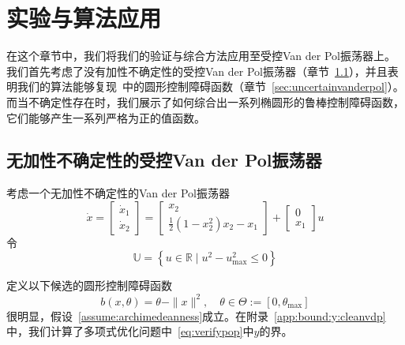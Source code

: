 
\chapter{实验与算法应用}

在这个章节中，我们将我们的验证与综合方法应用至受控Van der Pol振荡器上。我们首先考虑了没有加性不确定性的受控Van der Pol振荡器（章节~\ref{sec:cleanvanderpol}），并且表明我们的算法能够复现~\cite{clark22arxiv-cbf}中的圆形控制障碍函数（章节~\ref{sec:uncertainvanderpol}）。而当不确定性存在时，我们展示了如何综合出一系列椭圆形的鲁棒控制障碍函数，它们能够产生一系列严格为正的值函数。

\section{无加性不确定性的受控Van der Pol振荡器}
\label{sec:cleanvanderpol}

考虑一个无加性不确定性的Van der Pol振荡器~\cite{clark22arxiv-cbf}
\begin{equation}\label{eq:cleanvdpodynamics}
    \dot{x} = \left[ \begin{array}{c}
        \dot{x}_1 \\ \dot{x}_2
    \end{array} \right] 
    = \left[ \begin{array}{c}
        x_2 \\
        \frac{1}{2}(1 - x_2^2) x_2 - x_1
    \end{array} \right]
    + \left[ \begin{array}{c}
        0 \\ x_1
    \end{array} \right] u
\end{equation}
令
\begin{equation}\label{eq:cleanvdpou}
    \mathbb{U} = \left\{ u \in \mathbb{R} \mid u^2 - u_{\max}^2 \le 0 \right\}
\end{equation}

定义以下候选的圆形控制障碍函数
\begin{equation}
    \label{eq:cleanvdpocbf}
    b(x, \theta) = \theta - \parallel x \parallel^2, \quad \theta \in \Theta := [0, \theta_{\max}]
\end{equation}
很明显，假设~\ref{assume:archimedeanness}成立。在附录~\ref{app:bound:y:cleanvdp}中，我们计算了多项式优化问题中~\eqref{eq:verifypop}中$y$的界。

